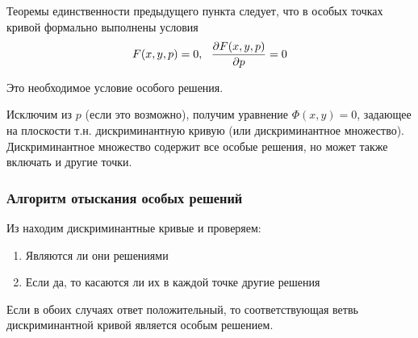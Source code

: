   Теоремы единственности предыдущего пункта следует, что в особых точках кривой формально выполнены условия
  \begin{equation}
  \label{four.seven}
  F(x, y, p) = 0,~~ \frac{\partial {F(x, y, p)}}{\partial {p}} = 0
  \end{equation}

  Это необходимое условие особого решения.

  Исключим из  $p$ (если это возможно), получим уравнение $\varPhi(x, y) = 0$, задающее на плоскости т.н. дискриминантную кривую (или дискриминантное множество). Дискриминантное множество содержит все особые решения, но может также включать и другие точки.

  \subsubsection{Алгоритм отыскания особых решений}
  Из  находим дискриминантные кривые и проверяем:
  \begin{enumerate}
  \item Являются ли они решениями
  \item Если да, то касаются ли их в каждой точке другие решения
  \end{enumerate}
  Если в обоих случаях ответ положительный, то соответствующая ветвь дискриминантной кривой является особым решением.